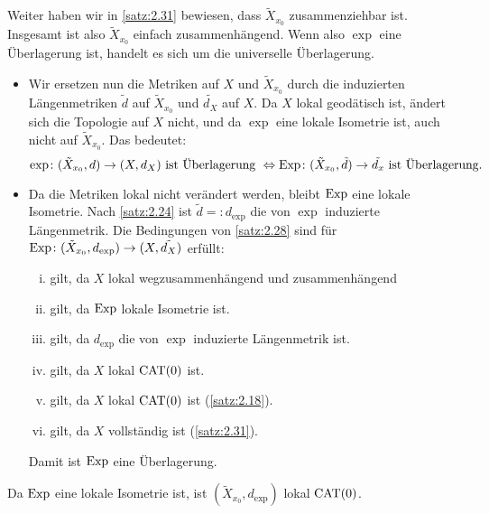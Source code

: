 \begin{beweis}
	Weiter haben wir in \autoref{satz:2.31} bewiesen, dass $\tilde{X}_{x_0}$ zusammenziehbar ist.
	Insgesamt ist also $\tilde{X}_{x_0}$ einfach zusammenhängend.
	Wenn also $\exp$ eine Überlagerung ist, handelt es sich um die universelle Überlagerung.
	\newpage
	\begin{itemize}
		\item Wir ersetzen nun die Metriken auf $X$ und $\tilde{X}_{x_0}$ durch die induzierten Längenmetriken $\tilde{d}$ auf $\tilde{X}_{x_0}$ und $\tilde{d_X}$ auf $X$.
		Da $X$ lokal geodätisch ist, ändert sich die Topologie auf $X$ nicht, und da $\exp$ eine lokale Isometrie ist, auch nicht auf $\tilde{X}_{x_0}$.
		Das bedeutet:
		\[
			\exp\colon (\tilde{X}_{x_0},d) \rightarrow (X,d_X) \text{ ist Überlagerung } \Leftrightarrow \operatorname{Exp}\colon (\tilde{X}_{x_0},\tilde{d}) \rightarrow \tilde{d_x} \text{ ist Überlagerung.}
		\]
		\item Da die Metriken lokal nicht verändert werden, bleibt $\operatorname{Exp}$ eine lokale Isometrie.
		Nach \autoref{satz:2.24} ist $\tilde{d} =: d_{\exp}$ die von $\exp$ induzierte Längenmetrik.
		Die Bedingungen von \autoref{satz:2.28} sind für \linebreak $\operatorname{Exp}\colon (\tilde{X}_{x_0},d_{\exp}) \rightarrow (X,\tilde{d_X})$ erfüllt:
		\begin{enumerate}[(i)]
			\item gilt, da $X$ lokal wegzusammenhängend und zusammenhängend
			\item gilt, da $\operatorname{Exp}$ lokale Isometrie ist.
			\item gilt, da $d_{\exp}$ die von $\exp$ induzierte Längenmetrik ist.
			\item gilt, da $X$ lokal $\operatorname{CAT(0)}$ ist.
			\item gilt, da $X$ lokal $\operatorname{CAT(0)}$ ist (\autoref{satz:2.18}).
			\item gilt, da $X$ vollständig ist (\autoref{satz:2.31}).
		\end{enumerate}
		Damit ist $\operatorname{Exp}$ eine Überlagerung. \qedhere
	\end{itemize}
\end{beweis}

\begin{bemerkung}
\label{bem:2.34}
	Da $\operatorname{Exp}$ eine lokale Isometrie ist, ist $(\tilde{X}_{x_0},d_{\exp})$ lokal $\operatorname{CAT(0)}$.
\end{bemerkung}

